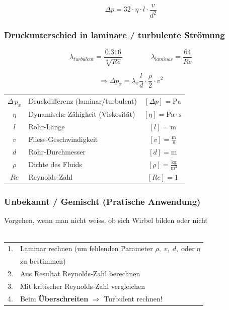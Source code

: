 $$ \boxed{ \Delta p = 32 \cdot \eta \cdot l \cdot \frac{v}{d^2} }  $$


\subsubsection{Druckunterschied in laminare / turbulente Strömung}

$$ \lambda_{turbulent} = \frac{0.316}{\sqrt[4]{Re}}  \qquad \qquad \lambda_{laminar} = \frac{64}{Re}  $$

$$ \boxed{ \Rightarrow \Delta p_x = \lambda_x \frac{l}{d} \cdot \frac{\rho}{2} \cdot v^2 } $$



\begin{tabular}{c l c}
		$\Delta \, p_x$ & Druckdifferenz (laminar/turbulent) & $[\Delta p] = \mathrm{Pa}$ \\
		$\eta$ & Dynamische Zähigkeit (Viskosität) & $[\eta] = \mathrm{Pa \cdot s}$  \\
		$l$ & Rohr-Länge & $[l] = \mathrm{m}$ \\
		\rule{0pt}{8pt}$v$ & Fliess-Geschwindigkeit & $[v] = \mathrm{\frac{m}{s}}$ \\
		$d$ & Rohr-Durchmesser & $[d] = \mathrm{m}$ \\		
		\rule{0pt}{8pt}$\rho$ & Dichte des Fluids & $[\rho] = \mathrm{\frac{kg}{m^3}}$ \\
		$Re$ & Reynolds-Zahl & $[Re] = 1$ \\
\end{tabular}




\subsubsection{Unbekannt / Gemischt (Pratische Anwendung)}
Vorgehen, wenn man nicht weiss, ob sich Wirbel bilden oder nicht \\
\\
\begin{tabular}{ll}
1. & Laminar rechnen (um fehlenden Parameter $\rho, \; v, \; d, \; \mathrm{oder} \; \eta$ \\
   &  zu bestimmen) \\
2. & Aus Resultat Reynolds-Zahl berechnen \\
3. & Mit kritischer Reynolds-Zahl vergleichen \\
4. & Beim \textbf{Überschreiten} $\Rightarrow$ Turbulent rechnen! \\
\end{tabular}



